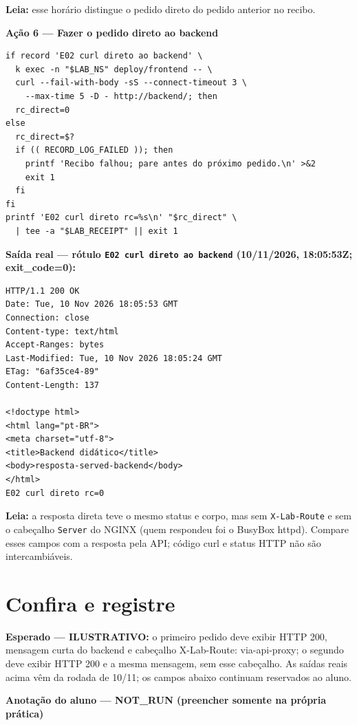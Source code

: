 \documentclass[12pt,openany,oneside,a4paper,chapter=TITLE,english,brazil]{abntex2}
\begin{document}
\textbf{Leia:} esse horário distingue o pedido direto do pedido anterior no recibo.

\textbf{Ação 6 --- Fazer o pedido direto ao backend}

\begin{verbatim}
if record 'E02 curl direto ao backend' \
  k exec -n "$LAB_NS" deploy/frontend -- \
  curl --fail-with-body -sS --connect-timeout 3 \
    --max-time 5 -D - http://backend/; then
  rc_direct=0
else
  rc_direct=$?
  if (( RECORD_LOG_FAILED )); then
    printf 'Recibo falhou; pare antes do próximo pedido.\n' >&2
    exit 1
  fi
fi
printf 'E02 curl direto rc=%s\n' "$rc_direct" \
  | tee -a "$LAB_RECEIPT" || exit 1
\end{verbatim}

\clearpage

\textbf{Saída real --- rótulo \texttt{E02 curl direto ao backend} (10/11/2026, 18:05:53Z; exit\_code=0):}

\begin{verbatim}
HTTP/1.1 200 OK
Date: Tue, 10 Nov 2026 18:05:53 GMT
Connection: close
Content-type: text/html
Accept-Ranges: bytes
Last-Modified: Tue, 10 Nov 2026 18:05:24 GMT
ETag: "6af35ce4-89"
Content-Length: 137

<!doctype html>
<html lang="pt-BR">
<meta charset="utf-8">
<title>Backend didático</title>
<body>resposta-served-backend</body>
</html>
E02 curl direto rc=0
\end{verbatim}

\textbf{Leia:} a resposta direta teve o mesmo status e corpo, mas sem \texttt{X-{}\allowbreak{}Lab-{}\allowbreak{}Route} e sem o cabeçalho \texttt{Server} do NGINX (quem respondeu foi o BusyBox httpd). Compare esses campos com a resposta pela API; código curl e status HTTP não são intercambiáveis.

\section*{Confira e registre}\label{confira-e-registre-1}
\addcontentsline{toc}{section}{Confira e registre}

\textbf{Esperado --- ILUSTRATIVO:} o primeiro pedido deve exibir HTTP 200, mensagem curta do backend e cabeçalho X-Lab-Route: via-api-proxy; o segundo deve exibir HTTP 200 e a mesma mensagem, sem esse cabeçalho. As saídas reais acima vêm da rodada de 10/11; os campos abaixo continuam reservados ao aluno.

\textbf{Anotação do aluno --- NOT\_RUN (preencher somente na própria prática)}
\end{document}
